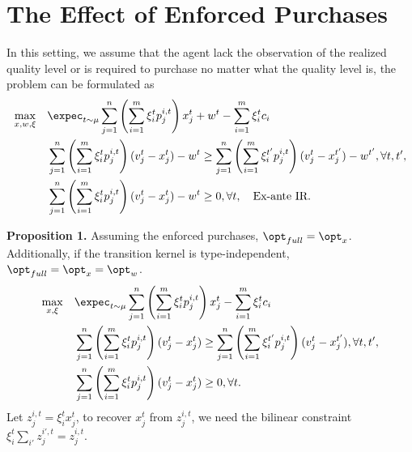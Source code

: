 
\section{The Effect of Enforced Purchases}
In this setting, we assume that the agent lack the observation of the realized quality level or is required to purchase no matter what the quality level is, the problem can be formulated as 
\begin{align*}
    \max_{x, w, \xi}\quad &\expec_{t \sim \mu}\sum_{j=1}^n \left(\sum_{i = 1}^m \xi^{t}_i p_j^{i, t}\right)  x^{t}_j  +w^{t} - \sum_{i = 1}^m \xi_i^{t} c_i \\
    &\sum_{j=1}^n \left(\sum_{i = 1}^m \xi^{t}_i p_j^{i, t}\right) (v_j^t - x_j^{t})- w^{t} \geq \sum_{j=1}^n \left(\sum_{i = 1}^m \xi^{t'}_i p_j^{i, t}\right)(v_j^t - x_j^{t'})- w^{t'}, \forall t, t', \\
    &\sum_{j=1}^n \left(\sum_{i = 1}^m \xi^{t}_i p_j^{i, t}\right)(v_j^t - x_j^{t})- w^{t} \geq 0,  \forall t, \quad \text{Ex-ante IR}.
\end{align*}


\textbf{Proposition 1. } Assuming the enforced purchases, $\opt_{full} = \opt_{x}$. Additionally, if the transition kernel is type-independent,  $\opt_{full} = \opt_{x} = \opt_w$. 
\begin{align*}
    \max_{x, \xi}\quad &\expec_{t \sim \mu}\sum_{j=1}^n \left(\sum_{i = 1}^m \xi^{t}_i p_j^{i, t}\right)  x^{t}_j  - \sum_{i = 1}^m \xi_i^{t} c_i \\
    &\sum_{j=1}^n \left(\sum_{i = 1}^m \xi^{t}_i p_j^{i, t}\right) (v_j^t - x_j^{t}) \geq \sum_{j=1}^n \left(\sum_{i = 1}^m \xi^{t'}_i p_j^{i, t}\right)(v_j^t - x_j^{t'}), \forall t, t', \\
    &\sum_{j=1}^n \left(\sum_{i = 1}^m \xi^{t}_i p_j^{i, t}\right)(v_j^t - x_j^{t}) \geq 0,  \forall t.
\end{align*}
Let $z_j^{i,t} = \xi_i^t x_j^t$, to recover $x_j^t$ from $z_j^{i,t}$, we need the bilinear constraint $\xi_i^t \sum_{i'} z_j^{i',t} = z_j^{i,t}$. 

